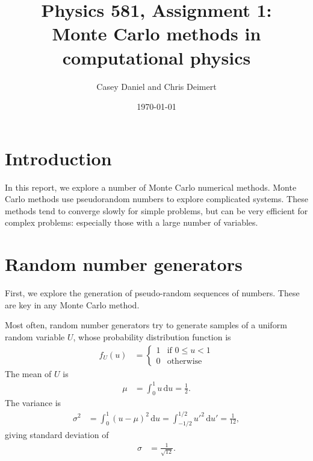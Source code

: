 \documentclass[twocolumn]{myarticle}
\renewcommand{\d}{\mathrm{d}}
\begin{document}
\title{Physics 581, Assignment 1:\\Monte Carlo methods in computational physics}
\author{Casey Daniel and Chris Deimert}
\date{\today}

\maketitle

\section{Introduction}
\label{sec:introduction}

In this report, we explore a number of Monte Carlo numerical methods.
Monte Carlo methods use pseudorandom numbers to explore complicated systems.
These methods tend to converge slowly for simple problems, but can be very efficient for complex problems: especially those with a large number of variables.

\section{Random number generators}
\label{sec:random_number_generators}

First, we explore the generation of pseudo-random sequences of numbers.
These are key in any Monte Carlo method.

Most often, random number generators try to generate samples of a uniform random variable $ U $, whose probability distribution function is
\begin{align}
    f_U(u) &= \begin{cases} 1 & \text{if } 0 \leq u < 1 \\ 0 & \text{otherwise} \end{cases}
\end{align}
The mean of $ U $ is
\begin{align}
    \mu &= \int_{0}^{1} u \, \d u = \frac{1}{2}.
\end{align}
The variance is
\begin{align}
    \sigma^2 &= \int_0^1 \left(u - \mu\right)^2 \, \d u = \int_{-1/2}^{1/2} u'^2 \, \d u' = \frac{1}{12},
\end{align}
giving standard deviation of
\begin{align}
    \sigma &= \frac{1}{\sqrt{12}}.
\end{align}




\end{document}
